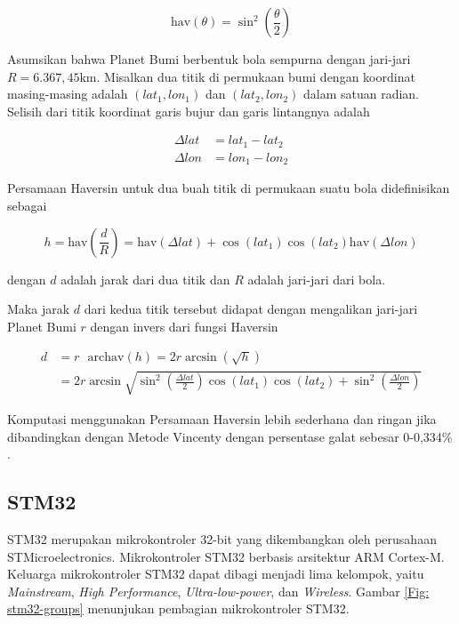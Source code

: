 $$\text{hav}(\theta) = \sin^2{\left(\frac{\theta}{2}\right)}$$

Asumsikan bahwa Planet Bumi berbentuk bola sempurna dengan jari-jari $R=6.367,45$km. Misalkan dua titik di permukaan bumi dengan koordinat masing-masing adalah $(lat_1, lon_1)$ dan $(lat_2, lon_2)$ dalam satuan radian. Selisih dari titik koordinat garis bujur dan garis lintangnya adalah

$$
\begin{aligned}
	\Delta lat &= lat_1 - lat_2 \\
	\Delta lon &= lon_1 - lon_2
\end{aligned}
$$

Persamaan Haversin untuk dua buah titik di permukaan suatu bola didefinisikan sebagai

$$
h = \mathrm{hav}\left(\frac{d}{R}\right) = \mathrm{hav}\left(\Delta lat\right) + \cos{\left(lat_1\right)} \cos{\left(lat_2\right)} \mathrm{hav}\left(\Delta lon\right)
$$

dengan $d$ adalah jarak dari dua titik dan $R$ adalah jari-jari dari bola.

Maka jarak $d$ dari kedua titik tersebut didapat dengan mengalikan jari-jari Planet Bumi $r$ dengan invers dari fungsi Haversin \cite{Omatu2013}

$$
\begin{aligned}
	d &= r \text{ }\mathrm{archav}(h) = 2r \arcsin{\left(\sqrt{h}\right)} \\
	&= 2r \arcsin{\sqrt{\sin^2{\left(\frac{\Delta lat}{2}\right)}  \cos{(lat_1)}\cos{(lat_2)} +\sin^2{\left(\frac{\Delta lon}{2}\right)}}}
\end{aligned} 
$$

Komputasi menggunakan Persamaan Haversin lebih sederhana dan ringan jika dibandingkan dengan Metode Vincenty dengan persentase galat sebesar 0-0,334\% \cite{Mahmoud2016}.

\subsection{STM32}
STM32 merupakan mikrokontroler 32-bit yang dikembangkan oleh perusahaan STMicroelectronics. Mikrokontroler STM32 berbasis arsitektur ARM Cortex-M. Keluarga mikrokontroler STM32 dapat dibagi menjadi lima kelompok, yaitu \textit{Mainstream}, \textit{High Performance}, \textit{Ultra-low-power}, dan \textit{Wireless}. Gambar \ref{Fig: stm32-groups} menunjukan pembagian mikrokontroler STM32.

